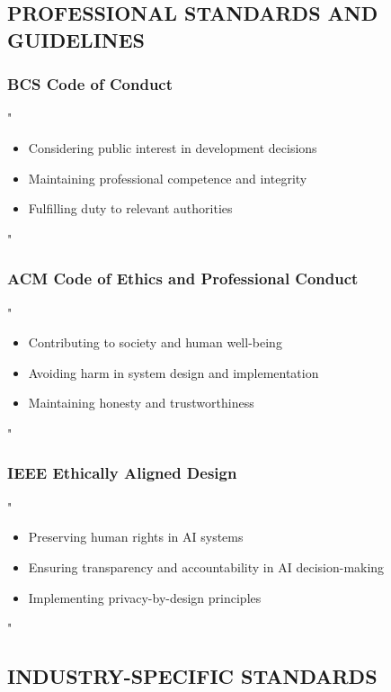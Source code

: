\documentclass[14pt,a4paper]{article}
\begin{document}
\textit{\parencite{DfE2024b}}


\subsection*{PROFESSIONAL STANDARDS AND GUIDELINES}

\subsubsection*{BCS Code of Conduct}
"
\begin{itemize}
    \item Considering public interest in development decisions
    \item Maintaining professional competence and integrity
    \item Fulfilling duty to relevant authorities
\end{itemize}
"

\textit{\parencite[pp. 1-5]{BCS2024}}


\subsubsection*{ACM Code of Ethics and Professional Conduct}
"
\begin{itemize}
    \item Contributing to society and human well-being
    \item Avoiding harm in system design and implementation
    \item Maintaining honesty and trustworthiness
\end{itemize}
"

\textit{\parencite[pp. 1-4]{ACM2024}}

\subsubsection*{IEEE Ethically Aligned Design}
"
\begin{itemize}
    \item Preserving human rights in AI systems
    \item Ensuring transparency and accountability in AI decision-making
    \item Implementing privacy-by-design principles
\end{itemize}
"

\textit{\parencite[pp. 2-5]{IEEE2024}}


\subsection*{INDUSTRY-SPECIFIC STANDARDS}
\end{document}

